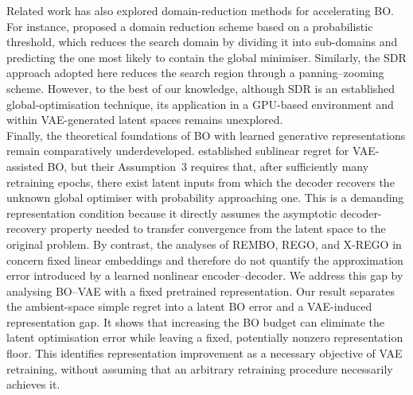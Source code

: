 \documentclass[pdflatex,sn-mathphys-num]{sn-jnl}%
\theoremstyle{thmstyleone}%
\theoremstyle{thmstyletwo}%
\theoremstyle{thmstylethree}%
\begin{document}
Related work has also explored domain-reduction methods for accelerating BO. For instance, \citet{salgia2021domainshrinkingbasedbayesianoptimization} proposed a domain reduction scheme based on a probabilistic threshold, which reduces the search domain by dividing it into sub-domains and predicting the one most likely to contain the global minimiser. Similarly, the SDR approach adopted here reduces the search region through a panning–zooming scheme. However, to the best of our knowledge, although SDR is an established global-optimisation technique, its application in a GPU-based environment and within VAE-generated latent spaces remains unexplored.\\

Finally, the theoretical foundations of BO with learned generative representations remain comparatively underdeveloped. \citet{grosnit2021highdimensionalbayesianoptimisationvariational} established sublinear regret for VAE-assisted BO, but their Assumption~3 requires that, after sufficiently many retraining epochs, there exist latent inputs from which the decoder recovers the unknown global optimiser with probability approaching one. This is a demanding representation condition because it directly assumes the asymptotic decoder-recovery property needed to transfer convergence from the latent space to the original problem. By contrast, the analyses of REMBO, REGO, and X-REGO in \cite{Wang2013,cartis2021globaloptimizationusingrandom}  concern fixed linear embeddings and therefore do not quantify the approximation error introduced by a learned nonlinear encoder--decoder. We address this gap by analysing BO--VAE with a fixed pretrained representation. Our result separates the ambient-space simple regret into a latent BO error and a VAE-induced representation gap. It shows that increasing the BO budget can eliminate the latent optimisation error while leaving a fixed, potentially nonzero representation floor. This identifies representation improvement as a necessary objective of VAE retraining, without assuming that an arbitrary retraining procedure necessarily achieves it.
\end{document}
